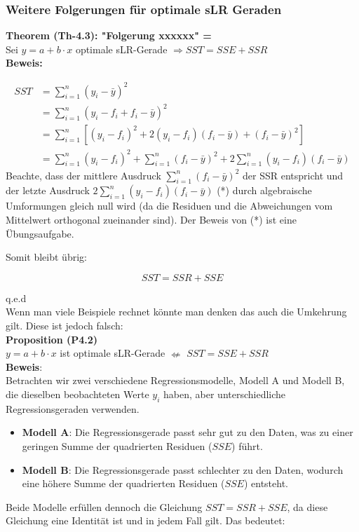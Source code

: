 \documentclass[12pt]{article}
\begin{document}
\subsubsection{Weitere Folgerungen für optimale sLR Geraden}  


\textbf{Theorem (Th-4.3): "Folgerung xxxxxx" =} \\[0.2cm]
Sei $ y = a + b \cdot x $ optimale sLR-Gerade $ \Longrightarrow SST = SSE + SSR $
\\[0.2cm]
\textbf{Beweis:} 

\begin{align*}
SST &= \sum_{i=1}^{n} (y_i - \bar{y})^2 \\
&= \sum_{i=1}^{n} (y_i - f_i + f_i - \bar{y})^2 \\
&= \sum_{i=1}^{n} [(y_i - f_i)^2 + 2(y_i - f_i)(f_i - \bar{y}) + (f_i - \bar{y})^2] \\
&= \sum_{i=1}^{n} (y_i - f_i)^2 + \sum_{i=1}^{n} (f_i - \bar{y})^2 + 2\sum_{i=1}^{n} (y_i - f_i)(f_i - \bar{y})
\end{align*}
%
Beachte, dass der mittlere Ausdruck $\sum_{i=1}^{n} (f_i - \bar{y})^2$ der SSR entspricht und der letzte Ausdruck $2\sum_{i=1}^{n} (y_i - f_i)(f_i - \bar{y})$ (*) durch algebraische Umformungen gleich null wird (da die Residuen und die Abweichungen vom Mittelwert orthogonal zueinander sind).
Der Beweis von (*) ist eine Übungsaufgabe.
 
Somit bleibt übrig:

\[
SST = SSR + SSE
\]

q.e.d \\[0.7cm]
%
Wenn man viele Beispiele rechnet könnte man denken das auch die Umkehrung gilt. Diese ist jedoch falsch: \\[0.2cm]
%
% 
\textbf{Proposition (P4.2)}\\[0.2cm]
$ y = a + b \cdot x $ ist optimale sLR-Gerade $ \nLeftarrow $ $ SST = SSE + SSR $ \\[0.2cm] 
%
\textbf{Beweis}:\\[0.2cm] 
%
Betrachten wir zwei verschiedene Regressionsmodelle, Modell A und Modell B, die dieselben beobachteten Werte \(y_i\) haben, aber unterschiedliche Regressionsgeraden verwenden.

\begin{itemize}
\item \textbf{Modell A}: Die Regressionsgerade passt sehr gut zu den Daten, was zu einer geringen Summe der quadrierten Residuen (\(SSE\)) führt.
\item \textbf{Modell B}: Die Regressionsgerade passt schlechter zu den Daten, wodurch eine höhere Summe der quadrierten Residuen (\(SSE\)) entsteht.
\end{itemize}
%
Beide Modelle erfüllen dennoch die Gleichung \(SST = SSR + SSE\), da diese Gleichung eine Identität ist und in jedem Fall gilt. Das bedeutet:
\end{document}
